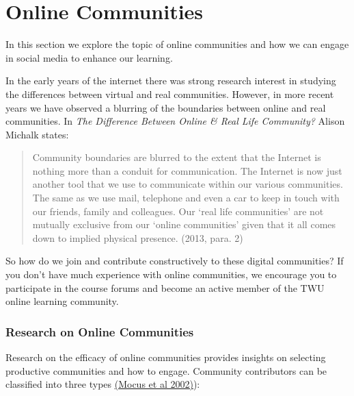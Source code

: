 \documentclass[
  letterpaper,
  DIV=11,
  numbers=noendperiod]{scrreprt}
\begin{document}
\section{Online Communities}\label{online-communities}

In this section we explore the topic of online communities and how we
can engage in social media to enhance our learning.

In the early years of the internet there was strong research interest in
studying the differences between virtual and real communities. However,
in more recent years we have observed a blurring of the boundaries
between online and real communities. In \emph{The Difference Between
Online \& Real Life Community?} Alison Michalk states:

\begin{quote}
Community boundaries are blurred to the extent that the Internet is
nothing more than a conduit for communication. The Internet is now just
another tool that we use to communicate within our various communities.
The same as we use mail, telephone and even a car to keep in touch with
our friends, family and colleagues. Our `real life communities' are not
mutually exclusive from our `online communities' given that it all comes
down to implied physical presence. (2013, para. 2)
\end{quote}

So how do we join and contribute constructively to these digital
communities? If you don't have much experience with online communities,
we encourage you to participate in the course forums and become an
active member of the TWU online learning community.

\subsubsection*{Research on Online
Communities}\label{research-on-online-communities}

Research on the efficacy of online communities provides insights on
selecting productive communities and how to engage. Community
contributors can be classified into three types
\href{https://twu.idm.oclc.org/login?url=https://search.ebscohost.com/login.aspx?direct=true&db=edb&AN=100369742&site=eds-live&scope=site}{(Mocus
et al 2002)}):
\end{document}
